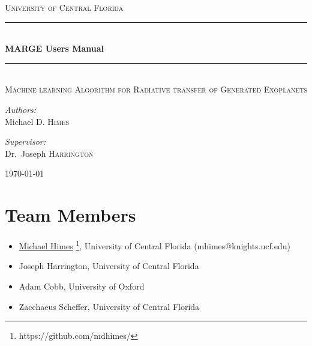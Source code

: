 \documentclass[letterpaper, 12pt]{article}
\begin{document}
\begin{titlepage}
\begin{center}

\textsc{\LARGE University of Central Florida}\\[1.5cm]

\rule{\linewidth}{0.5mm} \\[0.4cm]
{ \huge \bfseries MARGE Users Manual \\[0.4cm] }
\rule{\linewidth}{0.5mm} \\[1.0cm]

\textsc{\Large Machine learning Algorithm for Radiative transfer of Generated Exoplanets}\\[1.5cm]

\noindent
\begin{minipage}{0.4\textwidth}
\begin{flushleft}
\large
\emph{Authors:} \\
Michael D. \textsc{Himes} \\
\end{flushleft}
\end{minipage}%
\begin{minipage}{0.4\textwidth}
\begin{flushright} \large
\emph{Supervisor:} \\
Dr.~Joseph \textsc{Harrington}
\end{flushright}
\end{minipage}
\vfill

{\large \today}

\end{center}
\end{titlepage}

\tableofcontents
\newpage

\section{Team Members}
\label{sec:team}

\begin{itemize}
\item \href{https://github.com/mdhimes/}{Michael Himes}%
  \footnote{https://github.com/mdhimes/}, University of
  Central Florida (mhimes@knights.ucf.edu)
\item Joseph Harrington, University of Central Florida
\item Adam Cobb, University of Oxford
\item Zacchaeus Scheffer, University of Central Florida
\end{itemize}
\end{document}
